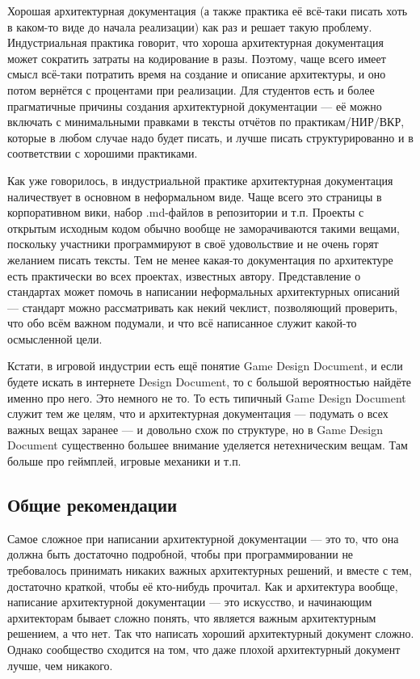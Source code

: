 \documentclass{../mcstext}
\begin{document}
Хорошая архитектурная документация (а также практика её всё-таки писать хоть в каком-то виде до начала реализации) как раз и решает такую проблему. Индустриальная практика говорит, что хороша архитектурная документация может сократить затраты на кодирование в разы. Поэтому, чаще всего имеет смысл всё-таки потратить время на создание и описание архитектуры, и оно потом вернётся с процентами при реализации. Для студентов есть и более прагматичные причины создания архитектурной документации --- её можно включать с минимальными правками в тексты отчётов по практикам/НИР/ВКР, которые в любом случае надо будет писать, и лучше писать структурированно и в соответствии с хорошими практиками.

Как уже говорилось, в индустриальной практике архитектурная документация наличествует в основном в неформальном виде. Чаще всего это страницы в корпоративном вики, набор .md-файлов в репозитории и т.п. Проекты с открытым исходным кодом обычно вообще не заморачиваются такими вещами, поскольку участники программируют в своё удовольствие и не очень горят желанием писать тексты. Тем не менее какая-то документация по архитектуре есть практически во всех проектах, известных автору. Представление о стандартах может помочь в написании неформальных архитектурных описаний --- стандарт можно рассматривать как некий чеклист, позволяющий проверить, что обо всём важном подумали, и что всё написанное служит какой-то осмысленной цели. 

Кстати, в игровой индустрии есть ещё понятие Game Design Document, и если будете искать в интернете Design Document, то с большой вероятностью найдёте именно про него. Это немного не то. То есть типичный Game Design Document служит тем же целям, что и архитектурная документация --- подумать о всех важных вещах заранее --- и довольно схож по структуре, но в Game Design Document существенно большее внимание уделяется нетехническим вещам. Там больше про геймплей, игровые механики и т.п.

\subsection{Общие рекомендации}

Самое сложное при написании архитектурной документации --- это то, что она должна быть достаточно подробной, чтобы при программировании не требовалось принимать никаких важных архитектурных решений, и вместе с тем, достаточно краткой, чтобы её кто-нибудь прочитал. Как и архитектура вообще, написание архитектурной документации --- это искусство, и начинающим архитекторам бывает сложно понять, что является важным архитектурным решением, а что нет. Так что написать хороший архитектурный документ сложно. Однако сообщество сходится на том, что даже плохой архитектурный документ лучше, чем никакого.
\end{document}
